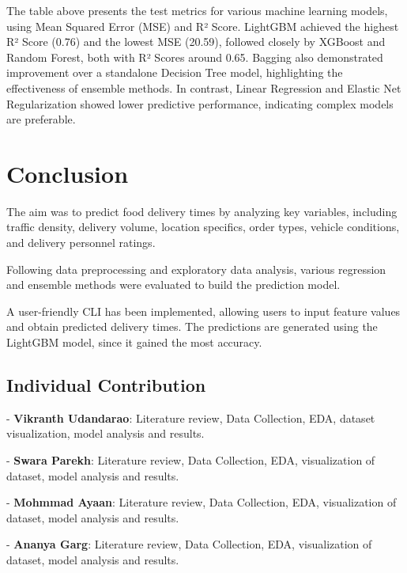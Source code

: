 \documentclass[10pt,twocolumn,letterpaper]{article}
\begin{document}
    The table above presents the test metrics for various machine learning models, using Mean Squared Error (MSE) and R² Score. LightGBM achieved the highest R² Score (0.76) and the lowest MSE (20.59), followed closely by XGBoost and Random Forest, both with R² Scores around 0.65. Bagging also demonstrated improvement over a standalone Decision Tree model, highlighting the effectiveness of ensemble methods. In contrast, Linear Regression and Elastic Net Regularization showed lower predictive performance, indicating complex models are preferable.

\section{Conclusion}
    The aim was to predict food delivery times by analyzing key variables, including traffic density, delivery volume, location specifics, order types, vehicle conditions, and delivery personnel ratings.

    Following data preprocessing and exploratory data analysis, various regression and ensemble methods were evaluated to build the prediction model.

    A user-friendly CLI has been implemented, allowing users to input feature values and obtain predicted delivery times. The predictions are generated using the LightGBM model, since it gained the most accuracy.

    \subsection{Individual Contribution}
        - \textbf{Vikranth Udandarao}: Literature review, Data Collection, EDA, dataset visualization, model analysis and results.

        - \textbf{Swara Parekh}: Literature review, Data Collection, EDA, visualization of dataset, model analysis and results.

        - \textbf{Mohmmad Ayaan}: Literature review, Data Collection, EDA, visualization of dataset, model analysis and results.

        - \textbf{Ananya Garg}: Literature review, Data Collection, EDA, visualization of dataset, model analysis and results.

\newpage
\end{document}
